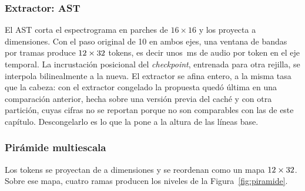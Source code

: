 \subsubsection{Extractor: AST}

El AST corta el espectrograma en parches de $16 \times 16$ y los proyecta a
\mHidden{} dimensiones. Con el paso original de 10 en ambos ejes, una ventana de
\nMels{} bandas por \nFrames{} tramas produce
$12 \times 32$ tokens, es decir unos \mTokenMs{}\,ms de audio
por token en el eje temporal. La incrustación posicional del \emph{checkpoint},
entrenada para otra rejilla, se interpola bilinealmente a la nueva. El extractor
se afina entero, a la misma tasa que la cabeza: con el extractor congelado la
propuesta quedó última en una comparación anterior, hecha sobre una versión previa
del caché y con otra partición, cuyas cifras no se reportan porque no son
comparables con las de este capítulo. Descongelarlo es lo que la pone a la altura
de las líneas base.

\subsubsection{Pirámide multiescala}

Los tokens se proyectan de \mHidden{} a \mDim{} dimensiones y se reordenan como
un mapa $12 \times 32$. Sobre ese mapa, cuatro ramas producen
los \mLevels{} niveles de la Figura~\ref{fig:piramide}.

